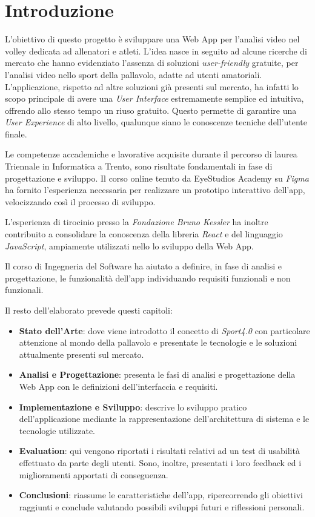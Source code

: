 \chapter{Introduzione}
\label{cha:introduzione}


L'obiettivo di questo progetto è sviluppare una Web App per l'analisi video nel volley dedicata ad allenatori e atleti. L'idea nasce in seguito ad alcune ricerche di mercato che hanno evidenziato l'assenza di soluzioni \textit{user-friendly} gratuite, per l'analisi video nello sport della pallavolo, adatte ad utenti amatoriali. L'applicazione, rispetto ad altre soluzioni già presenti sul mercato, ha infatti lo scopo principale di avere una \textit{User Interface} estremamente semplice ed intuitiva, offrendo allo stesso tempo un riuso gratuito. Questo permette di garantire una \textit{User Experience} di alto livello, qualunque siano le conoscenze tecniche dell'utente finale.

Le competenze accademiche e lavorative acquisite durante il percorso di laurea Triennale in Informatica a Trento, sono risultate fondamentali in fase di progettazione e sviluppo. Il corso online tenuto da EyeStudios Academy \cite{EyeStudios-Academy} su \textit{Figma} ha fornito l'esperienza necessaria per realizzare un prototipo interattivo dell'app, velocizzando così il processo di sviluppo.

L'esperienza di tirocinio presso la \textit{Fondazione Bruno Kessler} ha inoltre contribuito a consolidare la conoscenza della libreria \textit{React} e del linguaggio \textit{JavaScript}, ampiamente utilizzati nello lo sviluppo della Web App.

Il corso di Ingegneria del Software ha aiutato a definire, in fase di analisi e progettazione, le funzionalità dell'app individuando requisiti funzionali e non funzionali.

Il resto dell'elaborato prevede questi capitoli:

\begin{itemize}
    \item \textbf{Stato dell'Arte}: dove viene introdotto il concetto di \textit{Sport4.0} con particolare attenzione al mondo della pallavolo e presentate le tecnologie e le soluzioni attualmente presenti sul mercato.
    \item \textbf{Analisi e Progettazione}: presenta le fasi di analisi e progettazione della Web App con le definizioni dell'interfaccia e requisiti.
    \item \textbf{Implementazione e Sviluppo}: descrive lo sviluppo pratico dell'applicazione mediante la rappresentazione dell'architettura di sistema e le tecnologie utilizzate.  
    \item \textbf{Evaluation}: qui vengono riportati i risultati relativi ad un test di usabilità effettuato da parte degli utenti. Sono, inoltre, presentati i loro feedback ed i miglioramenti apportati di conseguenza.
    \item \textbf{Conclusioni}: riassume le caratteristiche dell'app, ripercorrendo gli obiettivi raggiunti e conclude valutando possibili sviluppi futuri e riflessioni personali.   
\end{itemize}




